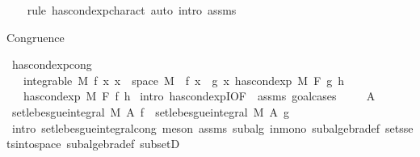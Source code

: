 \begin{isabellebody}
%
\isadelimproof
\ \ %
\endisadelimproof
%
\isatagproof
{}\isamarkupfalse%
\ {\isacharparenleft}{\kern0pt}rule\ has{\isacharunderscore}{\kern0pt}cond{\isacharunderscore}{\kern0pt}exp{\isacharunderscore}{\kern0pt}charact{\isacharparenleft}{\kern0pt}{}{\isacharparenright}{\kern0pt}{\isacharcomma}{\kern0pt}\ auto\ intro{\isacharcolon}{\kern0pt}\ assms{\isacharparenright}{\kern0pt}%
\endisatagproof
{\isafoldproof}%
%
\isadelimproof
%
\endisadelimproof
%
\begin{isamarkuptext}%
Congruence%
\end{isamarkuptext}\isamarkuptrue%
\isamarkupfalse%
\ has{\isacharunderscore}{\kern0pt}cond{\isacharunderscore}{\kern0pt}exp{\isacharunderscore}{\kern0pt}cong{\isacharcolon}{\kern0pt}\isanewline
\ \ \ {\isachardoublequoteopen}integrable\ M\ f{\isachardoublequoteclose}\ {\isachardoublequoteopen}{\isasymAnd}x{\isachardot}{\kern0pt}\ x\ {\isasymin}\ space\ M\ {\isasymLongrightarrow}\ f\ x\ {\isacharequal}{\kern0pt}\ g\ x{\isachardoublequoteclose}\ {\isachardoublequoteopen}has{\isacharunderscore}{\kern0pt}cond{\isacharunderscore}{\kern0pt}exp\ M\ F\ g\ h{\isachardoublequoteclose}\isanewline
\ \ \ {\isachardoublequoteopen}has{\isacharunderscore}{\kern0pt}cond{\isacharunderscore}{\kern0pt}exp\ M\ F\ f\ h{\isachardoublequoteclose}\isanewline
%
\isadelimproof
%
\endisadelimproof
%
\isatagproof
{}\isamarkupfalse%
\ {\isacharparenleft}{\kern0pt}intro\ has{\isacharunderscore}{\kern0pt}cond{\isacharunderscore}{\kern0pt}expI{\isacharprime}{\kern0pt}{\isacharbrackleft}{\kern0pt}OF\ {\isacharunderscore}{\kern0pt}\ assms{\isacharparenleft}{\kern0pt}{}{\isacharparenright}{\kern0pt}{\isacharbrackright}{\kern0pt}{\isacharcomma}{\kern0pt}\ goal{\isacharunderscore}{\kern0pt}cases{\isacharparenright}{\kern0pt}\isanewline
\ \ \isamarkupfalse%
\ {\isacharparenleft}{\kern0pt}{}\ A{\isacharparenright}{\kern0pt}\isanewline
\ \ \isamarkupfalse%
\ {\isachardoublequoteopen}set{\isacharunderscore}{\kern0pt}lebesgue{\isacharunderscore}{\kern0pt}integral\ M\ A\ f\ {\isacharequal}{\kern0pt}\ set{\isacharunderscore}{\kern0pt}lebesgue{\isacharunderscore}{\kern0pt}integral\ M\ A\ g{\isachardoublequoteclose}\ \isamarkupfalse%
\ {\isacharparenleft}{\kern0pt}intro\ set{\isacharunderscore}{\kern0pt}lebesgue{\isacharunderscore}{\kern0pt}integral{\isacharunderscore}{\kern0pt}cong{\isacharparenright}{\kern0pt}\ {\isacharparenleft}{\kern0pt}meson\ assms{\isacharparenleft}{\kern0pt}{}{\isacharparenright}{\kern0pt}\ subalg\ in{\isacharunderscore}{\kern0pt}mono\ subalgebra{\isacharunderscore}{\kern0pt}def\ sets{\isachardot}{\kern0pt}sets{\isacharunderscore}{\kern0pt}into{\isacharunderscore}{\kern0pt}space\ subalgebra{\isacharunderscore}{\kern0pt}def\ subsetD{\isacharparenright}{\kern0pt}{\isacharplus}{\kern0pt}\isanewline

\end{isabellebody}

